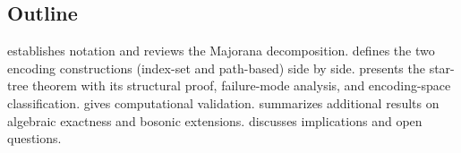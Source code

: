 \subsection{Outline}

 establishes notation and reviews the Majorana
decomposition.   defines the two encoding
constructions (index-set and path-based) side by side.
 presents the star-tree theorem with its
structural proof, failure-mode analysis, and encoding-space
classification.   gives computational validation.
 summarizes additional results on algebraic
exactness and bosonic extensions.   discusses
implications and open questions.
